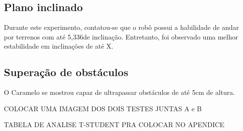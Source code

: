 \documentclass[../main.tex]{subfiles}
\begin{document}
  \subsection{Plano inclinado}
  Durante este experimento, contatou-se que o robô possui a habilidade de andar por terrenos com até 5,336\degree de inclinação. Entretanto, foi observado uma melhor estabilidade em inclinações de até X\degree. 
  
  \subsection{Superação de obstáculos}
  O Caramelo se mostrou capaz de ultrapassar obstáculos de até 5cm de altura. 

  COLOCAR UMA IMAGEM DOS DOIS TESTES JUNTAS A e B

  TABELA DE ANALISE T-STUDENT PRA COLOCAR NO APENDICE 



   
\end{document}
